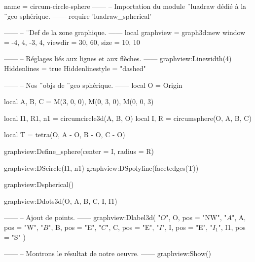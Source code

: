 \documentclass{standalone}
\begin{document}
\begin{luadraw}{name = circum-circle-sphere}
------
-- Importation du module ¨luadraw dédié à la ¨geo sphérique.
------
require 'luadraw_spherical'

------
-- ¨Def de la zone graphique.
------
local graphview = graph3d:new{
  window  = {-4, 4, -3, 4},
  viewdir = {30, 60},
  size    = {10, 10}
}

------
-- Réglages liés aux lignes et aux flèches.
------
graphview:Linewidth(4)
Hiddenlines     = true
Hiddenlinestyle = "dashed"

------
-- Nos ¨objs de ¨geo sphérique.
------
local O = Origin

local A, B, C = M(3, 0, 0), M(0, 3, 0), M(0, 0, 3)

local I1, R1, n1 = circumcircle3d(A, B, O)
local I, R       = circumsphere(O, A, B, C)

local T = tetra(O, A - O, B - O, C - O)

graphview:Define_sphere({center = I, radius = R})

graphview:DScircle({I1, n1})
graphview:DSpolyline(facetedges(T))

graphview:Dspherical()

graphview:Ddots3d({O, A, B, C, I, I1})

------
-- Ajout de points.
------
graphview:Dlabel3d(
  "$O$", O, {pos = "NW"},
  "$A$", A, {pos = "W"},
  "$B$", B, {pos = "E"},
  "$C$", C, {pos = "E"},
  "$I$", I, {pos = "E"},
  "$I_1$", I1, {pos = "S"}
)

------
-- Montrons le résultat de notre oeuvre.
------
graphview:Show()
\end{luadraw}
\end{document}
